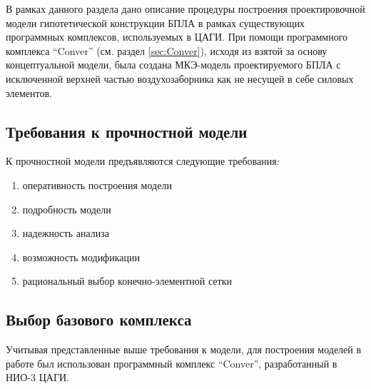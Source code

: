 
В рамках данного раздела дано описание процедуры построения проектировочной модели гипотетической конструкции БПЛА в рамках существующих программных комплексов, используемых в ЦАГИ. При помощи программного комплекса ``Conver'' (см. раздел \ref{sec:Conver}), исходя из взятой за основу концептуальной модели, была создана МКЭ-модель проектируемого БПЛА с исключенной верхней частью воздухозаборника как не несущей в себе силовых элементов. 




\subsection{Требования к прочностной модели}

К прочностной модели предъявляются следующие требования:

\begin{enumerate}
\item оперативность построения модели
\item подробность модели
\item надежность анализа
\item возможность модификации 
\item рациональный выбор конечно-элементной сетки
\end{enumerate}

\subsection{Выбор базового комплекса}
Учитывая представленные выше требования к модели, для построения моделей в работе был использован программный комплекс ``Conver'', разработанный в НИО-3 ЦАГИ. 



